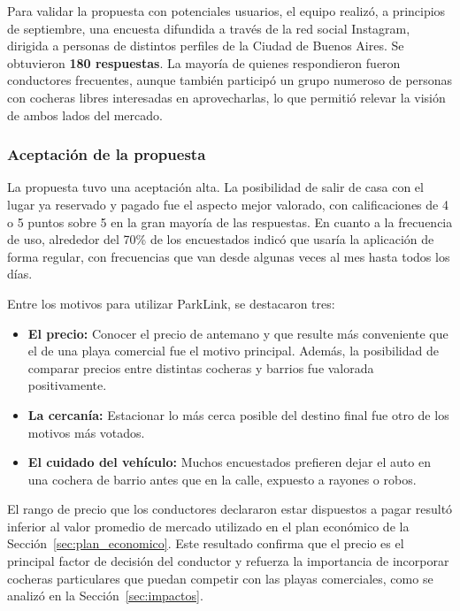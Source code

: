 Para validar la propuesta con potenciales usuarios, el equipo realizó, a principios de septiembre, una encuesta difundida a través de la red social Instagram, dirigida a personas de distintos perfiles de la Ciudad de Buenos Aires. Se obtuvieron \textbf{180 respuestas}. La mayoría de quienes respondieron fueron conductores frecuentes, aunque también participó un grupo numeroso de personas con cocheras libres interesadas en aprovecharlas, lo que permitió relevar la visión de ambos lados del mercado.

\subsubsection{Aceptación de la propuesta}

La propuesta tuvo una aceptación alta. La posibilidad de salir de casa con el lugar ya reservado y pagado fue el aspecto mejor valorado, con calificaciones de 4 o 5 puntos sobre 5 en la gran mayoría de las respuestas. En cuanto a la frecuencia de uso, alrededor del 70\% de los encuestados indicó que usaría la aplicación de forma regular, con frecuencias que van desde algunas veces al mes hasta todos los días.

Entre los motivos para utilizar ParkLink, se destacaron tres:

\begin{itemize}
    \item \textbf{El precio:} Conocer el precio de antemano y que resulte más conveniente que el de una playa comercial fue el motivo principal. Además, la posibilidad de comparar precios entre distintas cocheras y barrios fue valorada positivamente.
    \item \textbf{La cercanía:} Estacionar lo más cerca posible del destino final fue otro de los motivos más votados.
    \item \textbf{El cuidado del vehículo:} Muchos encuestados prefieren dejar el auto en una cochera de barrio antes que en la calle, expuesto a rayones o robos.
\end{itemize}

El rango de precio que los conductores declararon estar dispuestos a pagar resultó inferior al valor promedio de mercado utilizado en el plan económico de la Sección~\ref{sec:plan_economico}. Este resultado confirma que el precio es el principal factor de decisión del conductor y refuerza la importancia de incorporar cocheras particulares que puedan competir con las playas comerciales, como se analizó en la Sección~\ref{sec:impactos}.

